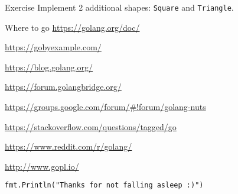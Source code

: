 \documentclass[10pt]{beamer}
\begin{document}
	
	\begin{frame}[fragile]{Exercise}
		Implement 2 additional shapes: \texttt{Square} and \texttt{Triangle}.
	\end{frame}
	
	
	\begin{frame}[fragile]{Where to go}
		\href{https://golang.org/doc/}{https://golang.org/doc/}
		
		\href{https://gobyexample.com/}{https://gobyexample.com/}
		
		\href{https://blog.golang.org/}{https://blog.golang.org/}
		
		\href{https://forum.golangbridge.org/}{https://forum.golangbridge.org/}
		
		\href{https://groups.google.com/forum/#!forum/golang-nuts}{https://groups.google.com/forum/\#!forum/golang-nuts}
		
		\href{https://stackoverflow.com/questions/tagged/go}{https://stackoverflow.com/questions/tagged/go}
		
		\href{https://www.reddit.com/r/golang/}{https://www.reddit.com/r/golang/}
		
		\href{http://www.gopl.io/}{http://www.gopl.io/}
	\end{frame}
									
	
	\begin{frame}[fragile]{}
		\begin{center}
			\texttt{fmt.Println("Thanks for not falling asleep :)")}
		\end{center}
	\end{frame}
\end{document}
